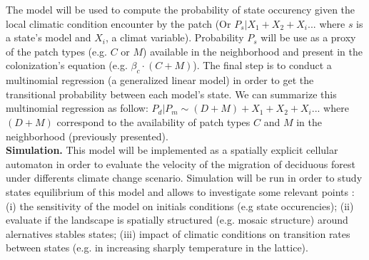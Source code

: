 %

The model will be used to compute the probability of state occurency given the
local climatic condition encounter by the patch (Or $P_{s}|X_1+X_2+X_i...$
where $s$ is a state's model and $X_i$, a climat variable). Probability $P_s$
will be use as a proxy of the patch types (e.g. $C$ or $M$) available in the
neighborhood and present in the colonization's equation (e.g. $\beta_c \cdot
(C+M)$). The final step is to conduct a multinomial regression (a generalized
linear model) in order to get the transitional probability between each
model's state. We can summarize this multinomial regression as follow:
$P_{d}|P_{m} \sim (D+M) + X_1+X_2+X_i... $ where $(D+M)$ correspond to the
availability of patch types $C$ and $M$ in the neighborhood (previously
presented).\\



\textbf{Simulation.} This model will be implemented as a spatially explicit
cellular automaton in order to evaluate the velocity of the
migration of deciduous forest under differents climate change scenario.
Simulation will be run in order to study states equilibrium of this model and
allows to investigate some relevant points : (i) the sensitivity of
the model on initials conditions (e.g state occurencies); (ii) evaluate if the
landscape is spatially structured (e.g. mosaic structure) around alernatives
stables states; (iii) impact of climatic conditions on transition rates
between states (e.g. in increasing sharply temperature in the lattice). \\

